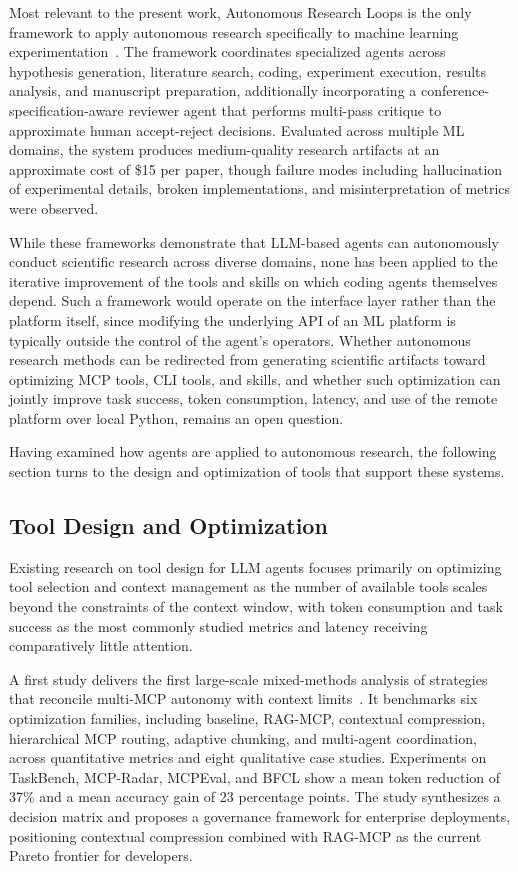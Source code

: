 \documentclass[
english,                 %
bibtex,                  %
includeExtraAbstracts, %
]{kththesis}
\numberwithin{listing}{chapter}
\begin{document}
Most relevant to the present work, Autonomous Research Loops is the only framework to apply autonomous research specifically to machine learning experimentation~\cite{koyun_autonomous_2026}. The framework coordinates specialized agents across hypothesis generation, literature search, coding, experiment execution, results analysis, and manuscript preparation, additionally incorporating a conference-specification-aware reviewer agent that performs multi-pass critique to approximate human accept-reject decisions. Evaluated across multiple \gls{ML} domains, the system produces medium-quality research artifacts at an approximate cost of \$15 per paper, though failure modes including hallucination of experimental details, broken implementations, and misinterpretation of metrics were observed.

While these frameworks demonstrate that \gls{LLM}-based agents can autonomously conduct scientific research across diverse domains, none has been applied to the iterative improvement of the tools and skills on which coding agents themselves depend. Such a framework would operate on the interface layer rather than the platform itself, since modifying the underlying \gls{API} of an \gls{ML} platform is typically outside the control of the agent's operators. Whether autonomous research methods can be redirected from generating scientific artifacts toward optimizing \gls{MCP} tools, \gls{CLI} tools, and skills, and whether such optimization can jointly improve task success, token consumption, latency, and use of the remote platform over local Python, remains an open question.

Having examined how agents are applied to autonomous research, the following section turns to the design and optimization of tools that support these systems.

\subsection{Tool Design and Optimization}

Existing research on tool design for \gls{LLM} agents focuses primarily on optimizing tool selection and context management as the number of available tools scales beyond the constraints of the context window, with token consumption and task success as the most commonly studied metrics and latency receiving comparatively little attention.

A first study delivers the first large-scale mixed-methods analysis of strategies that reconcile multi-\gls{MCP} autonomy with context limits~\cite{v_scaling_2025}. It benchmarks six optimization families, including baseline, \gls{RAG}-\gls{MCP}, contextual compression, hierarchical \gls{MCP} routing, adaptive chunking, and multi-agent coordination, across quantitative metrics and eight qualitative case studies. Experiments on TaskBench, \gls{MCP}-Radar, \gls{MCP}Eval, and \gls{BFCL} show a mean token reduction of 37\% and a mean accuracy gain of 23 percentage points. The study synthesizes a decision matrix and proposes a governance framework for enterprise deployments, positioning contextual compression combined with \gls{RAG}-\gls{MCP} as the current Pareto frontier for developers.
\end{document}
